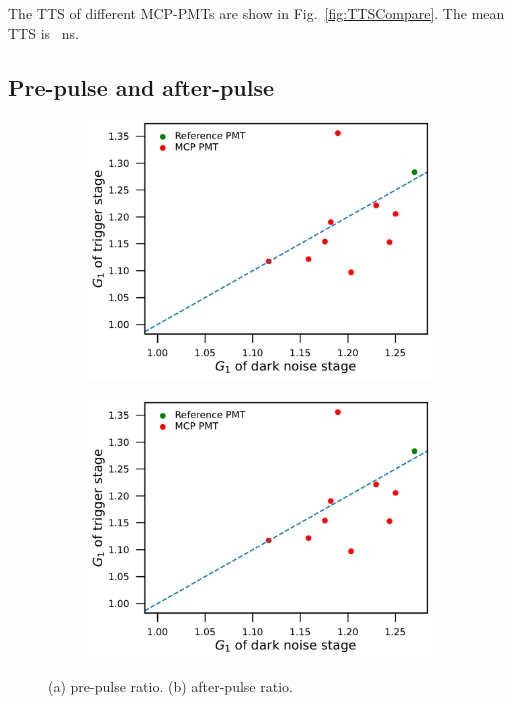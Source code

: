 The TTS of different MCP-PMTs are show in Fig.~\ref{fig:TTSCompare}. The mean TTS is \SI{}{ns}.


\subsection{Pre-pulse and after-pulse}
\begin{figure}[!htbp]
    \centering
    \begin{subfigure}[b]{0.49\textwidth}
        \includegraphics[width=\textwidth,page=10]{figures/result/compare.pdf}
        \caption{}
        \label{fig:prepulseCompare}
    \end{subfigure}
    \begin{subfigure}[b]{0.49\textwidth}
        \includegraphics[width=\textwidth,page=11]{figures/result/compare.pdf}
        \caption{}
        \label{fig:afterpulseCompare}
    \end{subfigure}
    \caption{(a) pre-pulse ratio. (b) after-pulse ratio.}
\end{figure}
